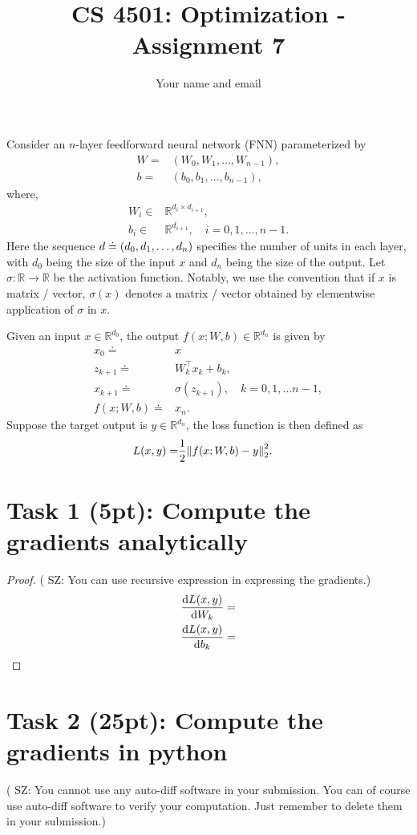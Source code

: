 \documentclass[11pt]{article}
\newcommand{\sz}[1]{({\color{blue} {SZ: #1}})}
\newcommand{\R}{\mathbb{R}}
\begin{document}
\title{CS 4501: Optimization - Assignment 7}
\author{Your name and email}
\date{}
\maketitle

Consider an $n$-layer feedforward neural network (FNN) parameterized by 
\begin{align}
  W =& (W_0, W_1, \dots, W_{n-1}), \\
  b =& (b_0, b_1, \dots, b_{n-1}),
\end{align}
where,
\begin{align}
  W_i \in& \R^{d_i \times d_{i+1}}, \\
  b_i \in& \R^{d_{i+1}}, \quad i=0, 1, \dots, n-1.
\end{align}
Here the sequence $d \doteq \qty(d_0, d_1, \dots, d_n)$ specifies the number of units in each layer, 
with $d_0$ being the size of the input $x$ and $d_n$ being the size of the output.
Let $\sigma : \R \to \R$ be the activation function.
Notably, we use the convention that if $x$ is matrix / vector,
$\sigma(x)$ denotes a matrix / vector obtained by elementwise application of $\sigma$ in $x$.

Given an input $x \in \R^{d_0}$, 
the output $f(x; W, b) \in \R^{d_n}$ is given by
\begin{align}
  x_0 \doteq& x \\
  z_{k+1} \doteq& W_k^\top x_k + b_k, \\
  x_{k+1} \doteq& \sigma(z_{k+1}), \quad k=0, 1, \dots n-1, \\
  f(x; W, b) \doteq& x_n.
\end{align}
Suppose the target output is $y \in \R^{d_n}$,
the loss function is then defined as
\begin{align}
  L(x, y) =& \frac{1}{2}\norm{f(x; W, b) - y}^{2}_2.
\end{align}
\section*{Task 1 (5pt): Compute the gradients analytically}
\begin{proof}
  \sz{You can use recursive expression in expressing the gradients.}
  \begin{align}
    \dv{L(x, y)}{W_k} =& \\
    \dv{L(x, y)}{b_k} =&
  \end{align}
\end{proof}
\section*{Task 2 (25pt): Compute the gradients in python}
\sz{You cannot use any auto-diff software in your submission. You can of course use auto-diff software to verify your computation. Just remember to delete them in your submission.}
\end{document}
